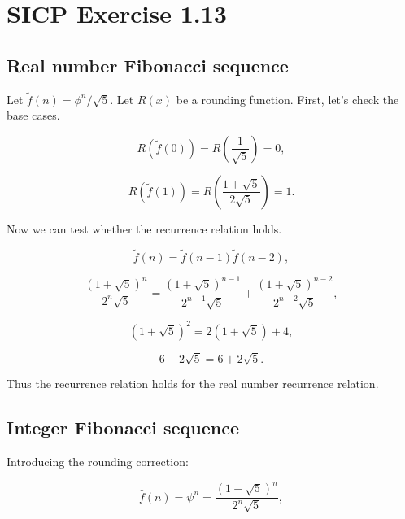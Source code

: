 \documentclass{article}
\author{J L Kaplan}
\begin{document}
\section*{SICP Exercise 1.13}
\subsection*{Real number Fibonacci sequence}

Let $\tilde{f}(n) = \phi^n / \sqrt{5}$. Let $R(x)$ be a rounding function. First, let's check the base cases.

\begin{equation}
  R(\tilde{f}(0)) = R \left( \frac{1}{\sqrt{5}} \right) = 0,
\end{equation}

\begin{equation}
  R(\tilde{f}(1)) = R \left( \frac{1 + \sqrt{5}}{2 \sqrt{5}} \right) = 1.
\end{equation}

Now we can test whether the recurrence relation holds.

\begin{equation}
  \tilde{f}(n) = \tilde{f}(n-1) \tilde{f}(n-2),
\end{equation}

\begin{equation}
  \frac{(1 + \sqrt{5})^n}{2^n \sqrt{5}} = \frac{(1 + \sqrt{5})^{n-1}}{2^{n-1} \sqrt{5}} + \frac{(1 + \sqrt{5})^{n-2}}{2^{n-2} \sqrt{5}},
\end{equation}

\begin{equation}
  (1 + \sqrt{5})^2 = 2 (1 + \sqrt{5}) + 4,
\end{equation}

\begin{equation}
  6 + 2 \sqrt{5} = 6 + 2 \sqrt{5}.
\end{equation}

Thus the recurrence relation holds for the real number recurrence relation.

\subsection*{Integer Fibonacci sequence}

Introducing the rounding correction:

\begin{equation}
  \hat{f}(n) = \psi^n = \frac{(1 - \sqrt{5})^n}{2^n \sqrt{5}},
\end{equation}
\end{document}

